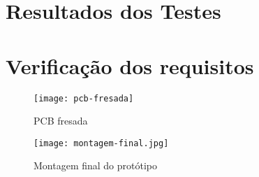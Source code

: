 \documentclass[../monografia.tex]{subfiles}
\begin{document}

\section{Resultados dos Testes}
\section{Verificação dos requisitos}

\begin{figure}[h!]
	\centering
	\texttt{[image: pcb-fresada]}
	\caption{PCB fresada}
	\label{fig:img5}
	\end{figure}
	

\begin{figure}[h]
	\centering
	\texttt{[image: montagem-final.jpg]}
	\caption{Montagem final do protótipo}
	\label{fig:prototipo}
\end{figure}
\end{document}
